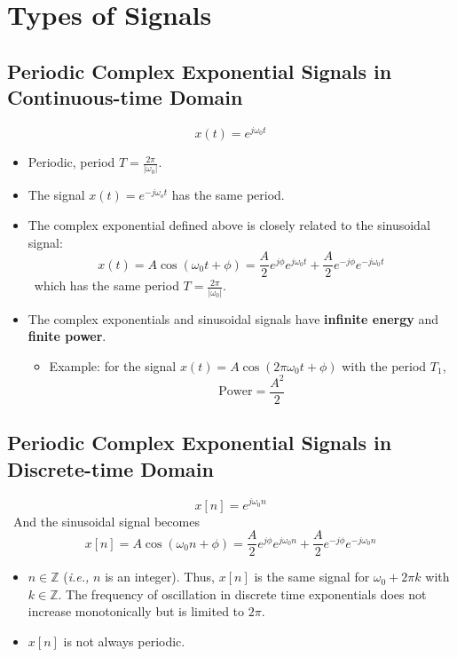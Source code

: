 \section{Types of Signals}
\subsection{Periodic Complex Exponential Signals in Continuous-time Domain}

 \[ x(t) = e^{j\omega_0 t} \]
\begin{itemize}
    \item Periodic, period $T = \frac{2\pi}{\lvert \omega_0 \rvert}$.
    \item The signal $x(t) = e^{-j\omega_o t}$ has the same period.
    \item The complex exponential defined above is closely related to the sinusoidal signal:
 \[ x(t) = A \cos(\omega_0 t + \phi) = \frac{A}{2} e^{j\phi}e^{j \omega_0 t} +\frac{A}{2} e^{-j\phi}e^{-j \omega_0 t} \]
  \ which has the same period $T = \frac{2\pi}{\lvert \omega_0 \rvert}$.
 \item The complex exponentials and sinusoidal signals have \textbf{infinite energy} and \textbf{finite
  power}.
 \begin{itemize}
  \item Example: for the signal $x(t)= A \cos(2\pi \omega_{0}t+\phi)$ with the period $T_{1}$,
  \[ \text{Power} = \frac{A^{2}}{2} \]
 \end{itemize}
\end{itemize}

\subsection{Periodic Complex Exponential Signals in Discrete-time Domain}

 \[ x[n] = e^{j\omega_0 n} \]
 \ And the sinusoidal signal becomes 
 \[ x[n] = A \cos(\omega_0 n + \phi) = \frac{A}{2} e^{j\phi}e^{j \omega_0 n} +\frac{A}{2} e^{-j\phi}e^{-j
  \omega_0 n} \]
 \begin{itemize}
  \item $n \in \mathbb{Z}$ (\textit{i.e.,} $n$ is an integer). Thus, $x[n]$ is the same signal for $\omega_0 + 2\pi k$ with $k \in
   \mathbb{Z}$. The frequency of oscillation in discrete time exponentials does not increase
   monotonically but is limited to $2\pi$.
  \item $x[n]$ is not always periodic.
 \end{itemize}
 
